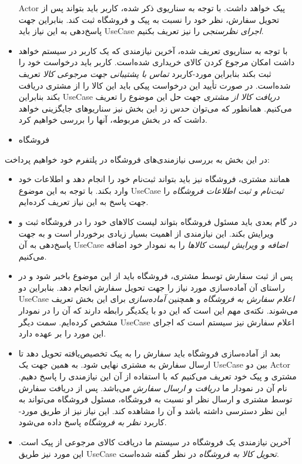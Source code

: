 \documentclass[]{article}
\begin{document}
\begin{itemize}
  Actor پیک خواهد داشت. با توجه به سناریو‌ی ذکر شده، کاربر باید بتواند
  پس از تحویل سفارش، نظر خود را نسبت به پیک و فروشگاه ثبت کند. بنابراین
  جهت پاسخ‌دهی به این نیاز باید UseCase \emph{اجرای نظرسنجی} را نیز
  تعریف بکنیم.
\item
  با توجه به سناریو‌ی تعریف شده، آخرین نیازمندی که یک کاربر در سیستم
  خواهد داشت امکان مرجوع کردن کالای خریداری شده‌است. کاربر باید درخواست
  خود را ثبت بکند بنابراین مورد-کاربرد \emph{تماس با پشتیبانی جهت مرجوعی
  کالا} تعریف شده‌است. در صورت تأیید این درخواست پیکی باید این کالا را
  از مشتری دریافت بکند بنابراین UseCase \emph{دریافت کالا از مشتری} جهت
  حل این موضوع را تعریف می‌کنیم. همانطور که می‌توان حدس زد این بخش نیز
  سناریو‌های جایگزینی خواهد داشت که در بخش مربوطه، آنها را بررسی خواهیم
  کرد.
\end{itemize}

\begin{itemize}
\item
  فروشگاه
\end{itemize}

در این بخش به بررسی نیازمندی‌های فروشگاه در پلتفرم خود خواهیم پرداخت:

\begin{itemize}
\item
  همانند مشتری، فروشگاه نیز باید بتواند ثبت‌نام خود را انجام دهد و
  اطلاعات خود وارد بکند. با توجه به این موضوع UseCase \emph{ثبت‌نام و
  ثبت اطلاعات فروشگاه} را جهت پاسخ به این نیاز تعریف کرده‌ایم.
\item
  در گام بعدی باید مسئول فروشگاه بتواند لیست کالاهای خود را در فروشگاه
  ثبت و ویرایش بکند. این نیازمندی از اهمیت بسیار زیادی برخوردار است و به
  جهت پاسخ‌دهی به آن UseCase \emph{اضافه و ویرایش لیست کالاها} را به
  نمودار خود اضافه می‌کنیم.
\item
  پس از ثبت سفارش توسط مشتری، فروشگاه باید از این موضوع باخبر شود و در
  راستای آن آماده‌سازی مورد نیاز را جهت تحویل سفارش انجام دهد. بنابراین
  دو UseCase \emph{اعلام سفارش به فروشگاه} و همچنین \emph{آماده‌سازی}
  برای این بخش تعریف می‌شوند. نکته‌ی مهم این است که این دو با یکدیگر
  رابطه دارند که آن را در نمودار مشخص کرده‌ایم. سمت دیگر UseCase اعلام
  سفارش نیز سیستم است که اجرای این مورد را بر عهده دارد.
\item
  بعد از آماده‌سازی فروشگاه باید سفارش را به پیک تخصیص‌یافته تحویل دهد
  تا ارسال سفارش به مشتری نهایی شود. به همین جهت یک UseCase بین دو Actor
  مشتری و پیک خود تعریف می‌کنیم که با استفاده از آن این نیازمندی را پاسخ
  دهیم. نام آن در نمودار ما \emph{دریافت و ارسال سفارش} می‌باشد. پس از
  دریافت سفارش توسط مشتری و ارسال نظر او نسبت به فروشگاه، مسئول فروشگاه
  می‌تواند به این نظر دسترسی داشته باشد و آن را مشاهده کند. این نیاز نیز
  از طریق مورد-کاربرد \emph{نظر به فروشگاه} پاسخ داده می‌شود.
\item
  آخرین نیازمندی یک فروشگاه در سیستم ما دریافت کالای مرجوعی از پیک است.
  این مورد نیز طریق UseCase \emph{تحویل کالا به فروشگاه} در نظر گفته
  شده‌است.
\end{itemize}
\end{document}
